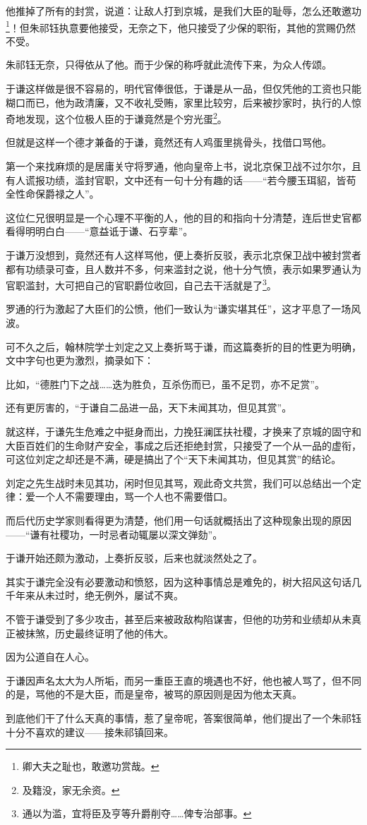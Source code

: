 \begin{multicols}{\theparacolNo}
他推掉了所有的封赏，说道：让敌人打到京城，是我们大臣的耻辱，怎么还敢邀功\footnote{卿大夫之耻也，敢邀功赏哉。}！但朱祁钰执意要他接受，无奈之下，他只接受了少保的职衔，其他的赏赐仍然不受。

朱祁钰无奈，只得依从了他。而于少保的称呼就此流传下来，为众人传颂。

于谦这样做是很不容易的，明代官俸很低，于谦是从一品，但仅凭他的工资也只能糊口而已，他为政清廉，又不收礼受贿，家里比较穷，后来被抄家时，执行的人惊奇地发现，这个位极人臣的于谦竟然是个穷光蛋\footnote{及籍没，家无余资。}。

但就是这样一个德才兼备的于谦，竟然还有人鸡蛋里挑骨头，找借口骂他。

第一个来找麻烦的是居庸关守将罗通，他向皇帝上书，说北京保卫战不过尔尔，且有人谎报功绩，滥封官职，文中还有一句十分有趣的话——“若今腰玉珥貂，皆苟全性命保爵禄之人”。

这位仁兄很明显是一个心理不平衡的人，他的目的和指向十分清楚，连后世史官都看得明明白白——“意益诋于谦、石亨辈”。

于谦万没想到，竟然还有人这样骂他，便上奏折反驳，表示北京保卫战中被封赏者都有功绩录可查，且人数并不多，何来滥封之说，他十分气愤，表示如果罗通认为官职滥封，大可把自己的官职爵位收回，自己去干活就是了\footnote{通以为滥，宜将臣及亨等升爵削夺……俾专治部事。}。

罗通的行为激起了大臣们的公愤，他们一致认为“谦实堪其任”，这才平息了一场风波。

可不久之后，翰林院学士刘定之又上奏折骂于谦，而这篇奏折的目的性更为明确，文中字句也更为激烈，摘录如下：

比如，“德胜门下之战……迭为胜负，互杀伤而已，虽不足罚，亦不足赏”。

还有更厉害的，“于谦自二品进一品，天下未闻其功，但见其赏”。

就这样，于谦先生危难之中挺身而出，力挽狂澜匡扶社稷，才换来了京城的固守和大臣百姓们的生命财产安全，事成之后还拒绝封赏，只接受了一个从一品的虚衔，可这位刘定之却还是不满，硬是搞出了个“天下未闻其功，但见其赏”的结论。

刘定之先生战时未见其功，闲时但见其骂，观此奇文共赏，我们可以总结出一个定律：爱一个人不需要理由，骂一个人也不需要借口。

而后代历史学家则看得更为清楚，他们用一句话就概括出了这种现象出现的原因——“谦有社稷功，一时忌者动辄屡以深文弹劾”。

于谦开始还颇为激动，上奏折反驳，后来也就淡然处之了。

其实于谦完全没有必要激动和愤怒，因为这种事情总是难免的，树大招风这句话几千年来从未过时，绝无例外，屡试不爽。

不管于谦受到了多少攻击，甚至后来被政敌构陷谋害，但他的功劳和业绩却从未真正被抹煞，历史最终证明了他的伟大。

因为公道自在人心。

于谦因声名太大为人所垢，而另一重臣王直的境遇也不好，他也被人骂了，但不同的是，骂他的不是大臣，而是皇帝，被骂的原因则是因为他太天真。

到底他们干了什么天真的事情，惹了皇帝呢，答案很简单，他们提出了一个朱祁钰十分不喜欢的建议——接朱祁镇回来。
\ifnum{}
	\end{multicols}
\fi
\newpage
